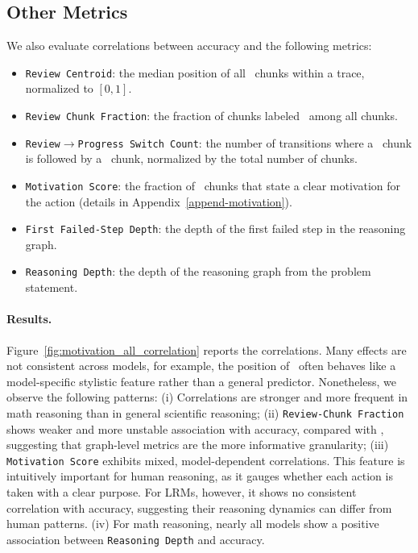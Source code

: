 \subsection{Other Metrics}\label{append:other metrics}

We also evaluate correlations between accuracy and the following metrics:
\begin{itemize}
    \item \texttt{Review Centroid}: the median position of all \review\ chunks within a trace, normalized to $[0,1]$.
    \item \texttt{Review Chunk Fraction}: the fraction of chunks labeled \review\ among all chunks.
    \item \texttt{Review$\rightarrow$Progress Switch Count}: the number of transitions where a \review\ chunk is followed by a \progress\ chunk, normalized by the total number of chunks.
    \item \texttt{Motivation Score}: the fraction of \review\ chunks that state a clear motivation for the action (details in Appendix~\ref{append-motivation}).
    \item \texttt{First Failed-Step Depth}: the depth of the first failed step in the reasoning graph.
    \item \texttt{Reasoning Depth}: the depth of the reasoning graph from the problem statement.
\end{itemize}

\paragraph{Results.}
Figure~\ref{fig:motivation_all_correlation} reports the correlations. Many effects are not consistent across models, for example, the position of \Review\ often behaves like a model-specific stylistic feature rather than a general predictor. Nonetheless, we observe the following patterns:
(i) Correlations are stronger and more frequent in math reasoning than in general scientific reasoning;
(ii) \texttt{Review-Chunk Fraction} shows weaker and more unstable association with accuracy, compared with \fsf, suggesting that graph-level metrics are the more informative granularity;
(iii) \texttt{Motivation Score} exhibits mixed, model-dependent correlations. This feature is intuitively important for human reasoning, as it gauges whether each action is taken with a clear purpose. For LRMs, however, it shows no consistent correlation with accuracy, suggesting their reasoning dynamics can differ from human patterns. (iv) For math reasoning, nearly all models show a positive association between \texttt{Reasoning Depth} and accuracy.

